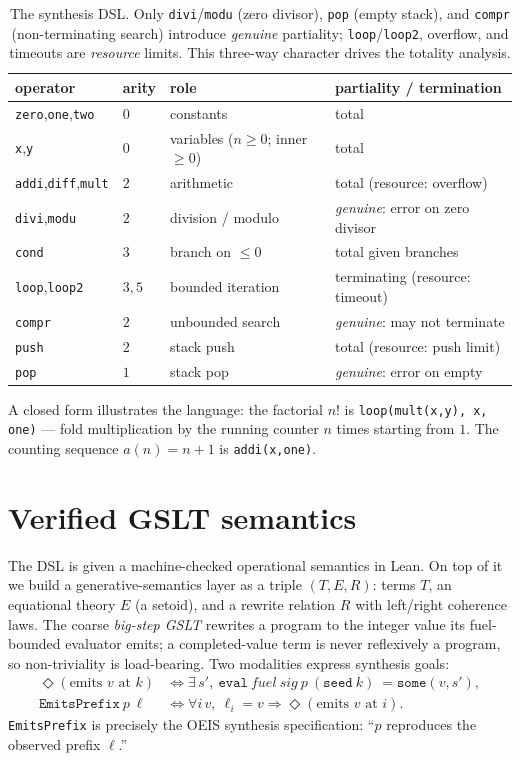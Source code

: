 \documentclass[11pt]{article}
\newcommand{\code}[1]{\texttt{#1}}
\begin{document}
\begin{table}[t]
\centering
\begin{tabular}{@{}llll@{}}
\toprule
operator & arity & role & partiality / termination \\
\midrule
\code{zero},\code{one},\code{two} & $0$ & constants & total \\
\code{x},\code{y} & $0$ & variables ($n\ge 0$; inner $\ge 0$) & total \\
\code{addi},\code{diff},\code{mult} & $2$ & arithmetic & total (resource: overflow) \\
\code{divi},\code{modu} & $2$ & division / modulo & \emph{genuine}: error on zero divisor \\
\code{cond} & $3$ & branch on $\le 0$ & total given branches \\
\code{loop},\code{loop2} & $3,5$ & bounded iteration & terminating (resource: timeout) \\
\code{compr} & $2$ & unbounded search & \emph{genuine}: may not terminate \\
\code{push} & $2$ & stack push & total (resource: push limit) \\
\code{pop} & $1$ & stack pop & \emph{genuine}: error on empty \\
\bottomrule
\end{tabular}
\caption{The synthesis DSL. Only \code{divi}/\code{modu} (zero divisor), \code{pop}
(empty stack), and \code{compr} (non-terminating search) introduce \emph{genuine}
partiality; \code{loop}/\code{loop2}, overflow, and timeouts are \emph{resource} limits.
This three-way character drives the totality analysis.}
\label{tab:ops}
\end{table}

A closed form illustrates the language: the factorial $n!$ is
\code{loop(mult(x,y),\,x,\,one)} --- fold multiplication by the running counter $n$ times
starting from $1$. The counting sequence $a(n)=n+1$ is \code{addi(x,one)}.

\section{Verified GSLT semantics}
\label{sec:gslt}

The DSL is given a machine-checked operational semantics in Lean. On top of it we build a
generative-semantics layer as a triple $(T,E,R)$: terms $T$, an equational theory $E$
(a setoid), and a rewrite relation $R$ with left/right coherence laws. The coarse
\emph{big-step GSLT} rewrites a program to the integer value its fuel-bounded evaluator
emits; a completed-value term is never reflexively a program, so non-triviality is
load-bearing. Two modalities express synthesis goals:
\begin{align*}
  \Diamond(\text{emits } v \text{ at } k) &\iff \exists\, s',\ \code{eval}\ \mathit{fuel}\ \mathit{sig}\ p\ (\code{seed}\ k)\ = \code{some}(v,s'),\\
  \code{EmitsPrefix}\ p\ \ell &\iff \forall i\, v,\ \ell_i = v \Rightarrow \Diamond(\text{emits } v \text{ at } i).
\end{align*}
\code{EmitsPrefix} is precisely the OEIS synthesis specification: ``$p$ reproduces the
observed prefix $\ell$.''
\end{document}
